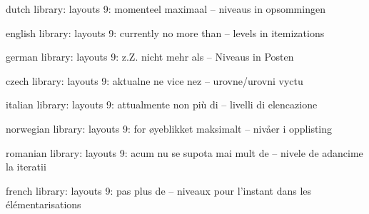 


\startmessages  dutch  library: layouts
      9: momenteel maximaal -- niveaus in opsommingen
\stopmessages

\startmessages  english  library: layouts
      9: currently no more than -- levels in itemizations
\stopmessages

\startmessages  german  library: layouts
      9: z.Z. nicht mehr als -- Niveaus in Posten
\stopmessages

\startmessages  czech  library: layouts
      9: aktualne ne vice nez -- urovne/urovni vyctu
\stopmessages

\startmessages  italian  library: layouts
      9: attualmente non più di -- livelli di elencazione
\stopmessages

\startmessages  norwegian  library: layouts
      9: for øyeblikket maksimalt -- nivåer i opplisting
\stopmessages

\startmessages  romanian  library: layouts
      9: acum nu se supota mai mult de -- nivele de adancime la iteratii
\stopmessages

\startmessages  french  library: layouts
      9: pas plus de -- niveaux pour l'instant dans les élémentarisations
\stopmessages

\unprotect


\newconditional\sublistitem       \setfalse\sublistitem
\newconditional\symbollistitem    \setfalse\symbollistitem
\newconditional\headlistitem      \setfalse\headlistitem
\newconditional\introlistitem     \setfalse\introlistitem
\newconditional\randomizeitems    \setfalse\randomizeitems
\newconditional\autointrolistitem \setfalse\autointrolistitem
\newconditional\optimizelistitem  \settrue \optimizelistitem
\newconditional\packlistitem      \setfalse\packlistitem
\newconditional\paragraphlistitem \setfalse\paragraphlistitem
\newconditional\textlistitem      \setfalse\textlistitem
\newconditional\firstlistitem     \setfalse\firstlistitem

